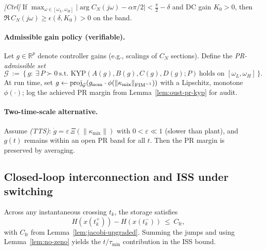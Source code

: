 \begin{lemma}\label{lem:oust-pr-phase}
\emph{[\textup{Ctrl}]} If $\max_{\omega\in[\omega_L,\omega_H]}|\arg C_N(j\omega)-\alpha\pi/2|<\frac\pi2-\delta$ and $\mathrm{DC}$ gain $K_0>0$, then $\Re\, C_N(j\omega)\ge \epsilon(\delta,K_0)>0$ on the band. 
\end{lemma}

\paragraph{Admissible gain policy (verifiable).}
Let $g\in\mathbb R^p$ denote controller gains (e.g., scalings of $C_N$ sections). Define the \emph{PR-admissible set}
\[
\mathcal G\ :=\ \{\,g:\ \exists\,P\succ0\ \text{s.t.\ KYP}(A(g),B(g),C(g),D(g);P)\ \text{holds on }[\omega_L,\omega_H]\,\}.
\]
At run time, set $g\leftarrow \mathrm{proj}_{\mathcal G}(g_{\mathrm{nom}}\cdot \phi(\|\kappa_{\mathrm{mix}}\|_{\mathrm{FIM}^{-1}}))$ with a Lipschitz, monotone $\phi(\cdot)$; log the achieved PR margin from Lemma~\ref{lem:oust-pr-kyp} for audit.

\paragraph{Two-time-scale alternative.}
Assume \emph{(TTS)}: $\dot g = \varepsilon\,\Xi(\|\kappa_{\mathrm{mix}}\|)$ with $0<\varepsilon\ll 1$ (slower than plant), and $g(t)$ remains within an open PR band for all $t$. Then the PR margin is preserved by averaging.

\subsection{Closed-loop interconnection and ISS under switching}

\begin{lemma}\label{lem:storage-jump}
Across any instantaneous crossing $t_k$, the storage satisfies
\[
H(x(t_k^+))-H(x(t_k^-))\ \le\ C_{\mathrm{fr}},
\]
with $C_{\mathrm{fr}}$ from Lemma~\ref{lem:jacobi-upgraded}. Summing the jumps and using Lemma~\ref{lem:no-zeno} yields the $t/\tau_{\min}$ contribution in the ISS bound.
\end{lemma}

